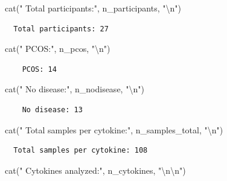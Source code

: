 \documentclass[
  letterpaper,
  DIV=11,
  numbers=noendperiod]{scrartcl}
\newenvironment{Shaded}{\begin{snugshade}}{\end{snugshade}}
\newcommand{\FunctionTok}[1]{\textcolor[rgb]{0.28,0.35,0.67}{#1}}
\newcommand{\NormalTok}[1]{\textcolor[rgb]{0.00,0.23,0.31}{#1}}
\newcommand{\SpecialCharTok}[1]{\textcolor[rgb]{0.37,0.37,0.37}{#1}}
\newcommand{\StringTok}[1]{\textcolor[rgb]{0.13,0.47,0.30}{#1}}
\begin{document}
\begin{Shaded}
\begin{Highlighting}[]
\FunctionTok{cat}\NormalTok{(}\StringTok{"  Total participants:"}\NormalTok{, n\_participants, }\StringTok{"}\SpecialCharTok{\textbackslash{}n}\StringTok{"}\NormalTok{)}
\end{Highlighting}
\end{Shaded}

\begin{verbatim}
  Total participants: 27 
\end{verbatim}

\begin{Shaded}
\begin{Highlighting}[]
\FunctionTok{cat}\NormalTok{(}\StringTok{"    PCOS:"}\NormalTok{, n\_pcos, }\StringTok{"}\SpecialCharTok{\textbackslash{}n}\StringTok{"}\NormalTok{)}
\end{Highlighting}
\end{Shaded}

\begin{verbatim}
    PCOS: 14 
\end{verbatim}

\begin{Shaded}
\begin{Highlighting}[]
\FunctionTok{cat}\NormalTok{(}\StringTok{"    No disease:"}\NormalTok{, n\_nodisease, }\StringTok{"}\SpecialCharTok{\textbackslash{}n}\StringTok{"}\NormalTok{)}
\end{Highlighting}
\end{Shaded}

\begin{verbatim}
    No disease: 13 
\end{verbatim}

\begin{Shaded}
\begin{Highlighting}[]
\FunctionTok{cat}\NormalTok{(}\StringTok{"  Total samples per cytokine:"}\NormalTok{, n\_samples\_total, }\StringTok{"}\SpecialCharTok{\textbackslash{}n}\StringTok{"}\NormalTok{)}
\end{Highlighting}
\end{Shaded}

\begin{verbatim}
  Total samples per cytokine: 108 
\end{verbatim}

\begin{Shaded}
\begin{Highlighting}[]
\FunctionTok{cat}\NormalTok{(}\StringTok{"  Cytokines analyzed:"}\NormalTok{, n\_cytokines, }\StringTok{"}\SpecialCharTok{\textbackslash{}n\textbackslash{}n}\StringTok{"}\NormalTok{)}
\end{Highlighting}
\end{Shaded}
\end{document}
